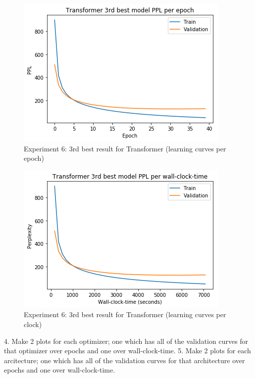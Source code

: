 \begin{itemize}
\begin{figure}[H]
	\centering
	\includegraphics[scale=0.8]{Q4-3_TR_3epoch.png}
	\caption{Experiment 6: 3rd best result for Transformer (learning curves per epoch)}
	\label{fig:fig22TR}
\end{figure}
\begin{figure}[H]
	\centering
	\includegraphics[scale=0.8]{Q4-3_TR_3time.png}
	\caption{Experiment 6: 3rd best result for Transformer (learning curves per clock)}
	\label{fig:fig22bTR}
\end{figure}

\end{itemize}


4. Make 2 plots for each optimizer; one which has all of the validation curves for that optimizer
over epochs and one over wall-clock-time.
5. Make 2 plots for each arcitecture; one which has all of the validation curves for that architecture
over epochs and one over wall-clock-time.

